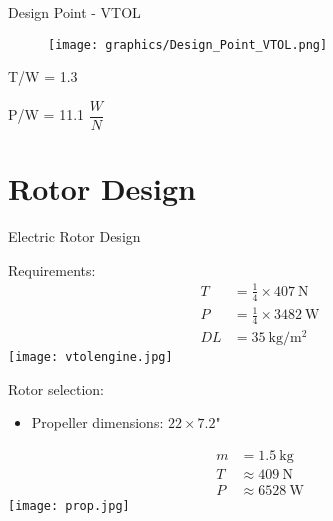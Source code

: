 \begin{frame}{Design Point - VTOL}
\noindent
\begin{minipage}[t]{0.6\linewidth}
    \begin{figure}
	    \texttt{[image: graphics/Design\_Point\_VTOL.png]}
    \end{figure}
\end{minipage}
\hfill%
\begin{minipage}[t]{0.3\linewidth}
    \begin{minipage}{3cm}
    \begin{block}{}
         T/W = 1.3
    \end{block}
    \end{minipage}
    \begin{minipage}{3cm}
    \begin{block}{}
         P/W = 11.1 $\dfrac{W}{N}$
    \end{block}
    \end{minipage}
\end{minipage}
\end{frame}

\section{Rotor Design}
\begin{frame}{Electric Rotor Design}
    \begin{minipage}[t]{0.5\textwidth}
        \large{Requirements:}
        \begin{align*}
            T &= \frac{1}{4}\times\SI{407}{\newton} \\
            P &= \frac{1}{4}\times\SI{3482}{\watt} \\
            DL &= \SI{35}{\kilogram\per\meter\squared} 
        \end{align*}
        \centering
        \texttt{[image: vtolengine.jpg]}
    \end{minipage}%
    \begin{minipage}[t]{0.5\textwidth}
        \large{Rotor selection:}
        \vspace{6pt}
        \begin{itemize}
            \item Propeller dimensions: $22 \times 7.2$"
        \end{itemize}
        \begin{align*} %
            m &= \SI{1.5}{\kilogram}\\
            T &\approx \SI{409}{\newton}\\
            P &\approx \SI{6528}{\watt}
        \end{align*}
        \centering
        \texttt{[image: prop.jpg]}
    \end{minipage}%
\end{frame}

